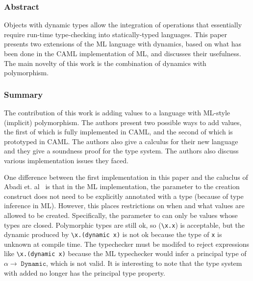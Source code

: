\documentclass[12pt]{article}	%
\begin{document}
\subsubsection*{Abstract}
Objects with dynamic types allow the integration of operations that essentially require run-time type-checking into statically-typed languages. This paper presents two extensions of the ML language with dynamics, based on what has been done in the CAML implementation of ML, and discusses their usefulness. The main novelty of this work is the combination of dynamics with polymorphism.

\subsubsection*{Summary}
The contribution of this work is adding \Dynamic values to a language with ML-style (implicit) polymorphism. The authors present two possible ways to add \Dynamic values, the first of which is fully implemented in CAML, and the second of which is prototyped in CAML. The authors also give a calculus for their new language and they give a soundness proof for the type system. The authors also discuss various implementation issues they faced.

One difference between the first implementation in this paper and the caluclus of Abadi et. al~\cite{Abadi1991Dynamic,Abadi1995DynamicPolymorphic} is that in the ML implementation, the parameter to the \dynamic creation construct does not need to be explicitly annotated with a type (because of type inference in ML). However, this places restrictions on when and what \Dynamic values are allowed to be created. Specifically, the parameter to \dynamic can only be values whose types are closed. Polymorphic types are still ok, so (\dynamic \verb!\x.x!) is acceptable, but the dynamic produced by \verb!\x.(dynamic x)! is not ok because the type of \texttt{x} is unknown at compile time. The typechecker must be modifed to reject expressions like \verb!\x.(dynamic x)! because the ML typechecker would infer a principal type of $\alpha \rightarrow \; \mathtt{Dynamic}$, which is not valid. It is interesting to note that the type system with \Dynamic added no longer has the principal type property.
\end{document}
